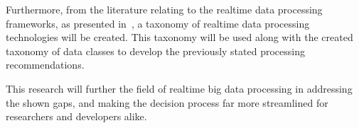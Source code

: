 \documentclass[a4paper,11pt]{article}
\begin{document}
Furthermore, from the literature relating to the realtime data processing frameworks, as presented
in~, a taxonomy of realtime data processing technologies will be created. This
taxonomy will be used along with the created taxonomy of data classes to develop the previously stated processing
recommendations.

This research will further the field of realtime big data processing in addressing the shown gaps, and making the
decision process far more streamlined for researchers and developers alike.


\newpage



\end{document}
